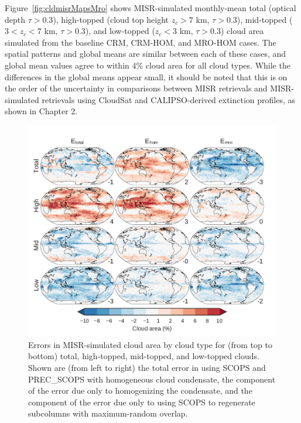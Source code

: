 Figure~\ref{fig:cldmisrMapsMro} shows MISR-simulated monthly-mean total
(optical depth \(\tau > 0.3\)), high-topped (cloud top height
\(z_c > 7\) km, \(\tau > 0.3\)), mid-topped (\(3 < z_c < 7\) km,
\(\tau > 0.3\)), and low-topped (\(z_c < 3\) km, \(\tau > 0.3\)) cloud
area simulated from the baseline CRM, CRM-HOM, and MRO-HOM cases. The
spatial patterns and global means are similar between each of these
cases, and global mean values agree to within 4\% cloud area for all
cloud types. While the differences in the global means appear small, it
should be noted that this is on the order of the uncertainty in
comparisons between MISR retrievals and MISR-simulated retrievals using
CloudSat and CALIPSO-derived extinction profiles, as shown in Chapter 2.

\begin{figure}[htbp]
\centering
\includegraphics{graphics/subgrid1_cldmisr_maps_diff.pdf}
\caption{\label{fig:cldmisrMapsMroDiff}Errors in MISR-simulated cloud
area by cloud type for (from top to bottom) total, high-topped,
mid-topped, and low-topped clouds. Shown are (from left to right) the
total error in using SCOPS and PREC\_SCOPS with homogeneous cloud
condensate, the component of the error due only to homogenizing the
condensate, and the component of the error due only to using SCOPS to
regenerate subcolumns with maximum-random
overlap.}\label{fig:cldmisrMapsMroDiff}
\end{figure}


